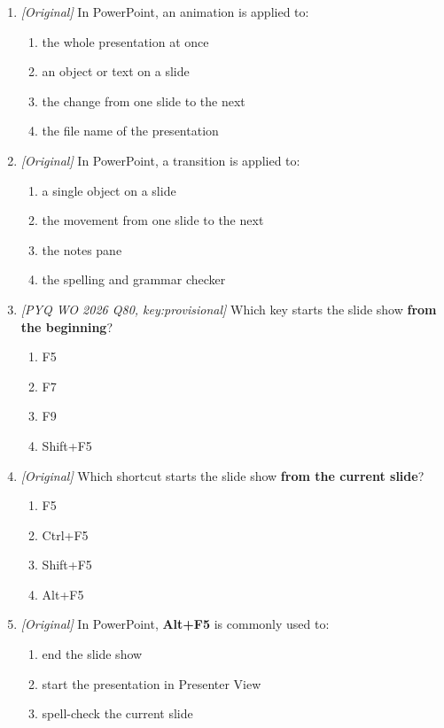 \begin{enumerate}[label=\textbf{Q\arabic*.}, leftmargin=*]
\item \textit{[Original]} In PowerPoint, an animation is applied to:
  \begin{enumerate}[label=\Alph*.]
    \item the whole presentation at once
    \item an object or text on a slide
    \item the change from one slide to the next
    \item the file name of the presentation
  \end{enumerate}
\item \textit{[Original]} In PowerPoint, a transition is applied to:
  \begin{enumerate}[label=\Alph*.]
    \item a single object on a slide
    \item the movement from one slide to the next
    \item the notes pane
    \item the spelling and grammar checker
  \end{enumerate}
\item \textit{[PYQ WO 2026 Q80, key:provisional]} Which key starts the slide
  show \textbf{from the beginning}?
  \begin{enumerate}[label=\Alph*.]
    \item F5
    \item F7
    \item F9
    \item Shift+F5
  \end{enumerate}
\item \textit{[Original]} Which shortcut starts the slide show \textbf{from the
  current slide}?
  \begin{enumerate}[label=\Alph*.]
    \item F5
    \item Ctrl+F5
    \item Shift+F5
    \item Alt+F5
  \end{enumerate}
\item \textit{[Original]} In PowerPoint, \textbf{Alt+F5} is commonly used to:
  \begin{enumerate}[label=\Alph*.]
    \item end the slide show
    \item start the presentation in Presenter View
    \item spell-check the current slide

\end{enumerate}
\end{enumerate}
